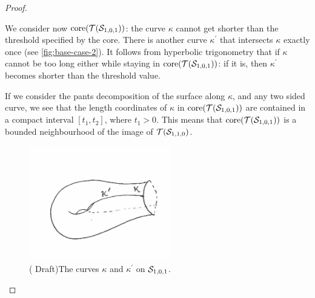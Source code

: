\documentclass[12pt, reqno]{amsart}
\begin{document}
\begin{proof}
\begin{itemize}
    We consider now $\mathrm{core}(\mathcal{T}(\mathcal{S}_{1,0,1}))$: the curve $\kappa$ cannot get shorter than the threshold specified by the core.
    There is another curve $\kappa^{\prime}$ that intersects $\kappa$ exactly once (see \autoref{fig:base-case-2}).
    It follows from hyperbolic trigonometry that if $\kappa$ cannot be too long either while staying in $\mathrm{core}(\mathcal{T}(\mathcal{S}_{1,0,1}))$: if it is, then $\kappa^{\prime}$ becomes shorter than the threshold value.

    If we consider the pants decomposition of the surface along $\kappa$, and any two sided curve, we see that the length coordinates of $\kappa$ in $\mathrm{core}(\mathcal{T}(\mathcal{S}_{1,0,1}))$ are contained in a compact interval $[t_1, t_2]$, where $t_1 > 0$.
    This means that $\mathrm{core}(\mathcal{T}(\mathcal{S}_{1,0,1}))$ is a bounded neighbourhood of the image of $\mathcal{T}(\mathcal{S}_{1,1,0})$.
    \begin{figure}[h]
      \centering
      \includegraphics[height=5cm]{images/s101-draft.png}
      \caption{({\color{red} Draft})The curves $\kappa$ and $\kappa^{\prime}$ on $\mathcal{S}_{1,0,1}$.}
      \label{fig:base-case-2}
    \end{figure}


\end{itemize}
\end{proof}
\end{document}
